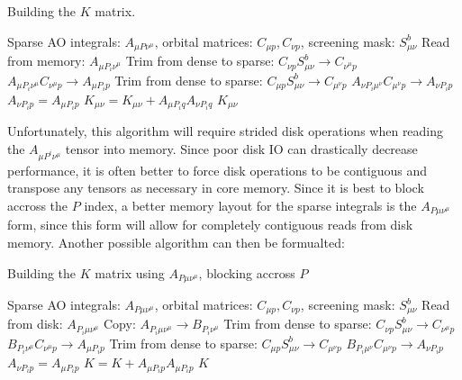 \begin{algorithm}[H]
\caption{Building the $K$ matrix.}
\begin{algorithmic}
\REQUIRE Sparse AO integrals: $A_{\mu P \nu^\mu}$, orbital matrices: $C_{\mu p}, C_{\nu p}$, screening mask: $S_{\mu \nu}^b$
    \STATE Read from memory: $A_{\mu P_i \nu^{\mu}}$
        \STATE Trim from dense to sparse: $C_{\nu p}S_{\mu \nu}^b \rightarrow C_{\nu^{\mu} p}$
        \STATE $A_{\mu P_i \nu^{\mu}} C_{\nu^{\mu} p} \rightarrow A_{\mu P_i p}$
            \STATE Trim from dense to sparse: $C_{\mu p}S_{\mu \nu}^b \rightarrow C_{\mu^{\nu} p}$
            \STATE $A_{\nu P_i \mu^{\nu}} C_{\mu^{\nu} p} \rightarrow A_{\nu P_i p}$
        \ELSE
            \STATE $A_{\nu P_i p} = A_{\mu P_i p}$ 
        \ENDIF
    \ENDFOR
    \STATE $K_{\mu \nu} = K_{\mu \nu} + A_{\mu P_i q} A_{\nu P_i q}$
\ENDFOR
\RETURN $K_{\mu \nu}$
\end{algorithmic}
\end{algorithm}

\noindent Unfortunately, this algorithm will require strided disk operations when reading the $A_{\mu P^i \nu^{\mu}}$ tensor into memory.
Since poor disk IO can drastically decrease performance, it is often better to force disk operations 
to be contiguous and transpose any tensors as necessary in core memory. Since it is best to block accross the $P$ index, a better
memory layout for the sparse integrals is the $A_{P \mu \nu^\mu}$ form, since this form will allow for completely 
contiguous reads from disk memory. Another possible algorithm can then be formualted:

\begin{algorithm}[H]
\caption{Building the $K$ matrix using $A_{P \mu \nu^\mu}$, blocking accross $P$}
\begin{algorithmic}
\REQUIRE Sparse AO integrals: $A_{P \mu \nu^\mu}$, orbital matrices: $C_{\mu p}, C_{\nu p}$, screening mask: $S_{\mu \nu}^b$
    \STATE Read from disk: $A_{P_i \mu \nu^{\mu}}$
        \STATE Copy: $A_{P_i \mu \nu^{\mu}} \rightarrow B_{P_i \nu^{\mu}}$
        \STATE Trim from dense to sparse: $C_{\nu p}S_{\mu \nu}^b \rightarrow C_{\nu^{\mu} p}$
        \STATE $B_{P_i \nu^{\mu}} C_{\nu^{\mu} p} \rightarrow A_{\mu P_i p}$
            \STATE Trim from dense to sparse: $C_{\mu p}S_{\mu \nu}^b \rightarrow C_{\mu^{\nu} p}$
            \STATE $B_{P_i \mu^{\nu}} C_{\mu^{\nu} p} \rightarrow A_{\nu P_i p}$
        \ELSE
            \STATE $A_{\nu P_i p} = A_{\mu P_i p}$ 
        \ENDIF
    \ENDFOR
    \STATE $K = K +  A_{\mu P_i p} A_{\mu P_i p} $
\ENDFOR
\RETURN $K$
\end{algorithmic}
\end{algorithm}

